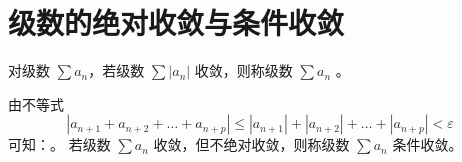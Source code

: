 \section{级数的绝对收敛与条件收敛}
\begin{definition}
	对级数 $\sum a_n$，若级数 $\sum |a_n|$ 收敛，则称级数 $\sum a_n$ 。
	
	由不等式
	\[
	|a_{n+1} + a_{n+2} + \dots + a_{n+p}| \le |a_{n+1}| + |a_{n+2}| + \dots + |a_{n+p}| < \varepsilon
	\]
	可知：。
	若级数 $\sum a_n$ 收敛，但不绝对收敛，则称级数 $\sum a_n$ 条件收敛。
\end{definition}

